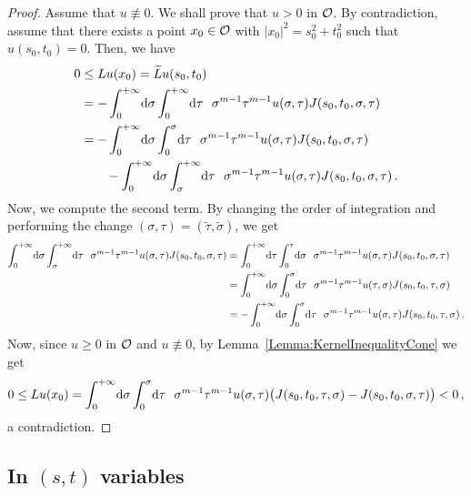 \begin{proof}
Assume that $u \not \equiv 0$. We shall prove that $u > 0$ in $\mathcal{O}$. By contradiction, assume that there exists a point $x_0\in \mathcal{O}$ with $|x_0|^2 = s_0^2 + t_0^2$ such that $u(s_0, t_0)= 0$. Then, we have
\begin{align*}
0 &\leq Lu(x_0) = \widetilde{L} u (s_0,t_0) \\
&= - \int_0^{+\infty} \!\! \d \sigma \int_0^{+\infty} \!\! \d \tau \ \ \sigma^{m-1} \tau^{m-1} u(\sigma, \tau) J(s_0,t_0,\sigma, \tau)   \\
& = - \int_0^{+\infty}  \!\! \d \sigma \int_0^{\sigma}  \!\! \d \tau \ \ \sigma^{m-1} \tau^{m-1} u(\sigma, \tau) J(s_0,t_0,\sigma, \tau)   \\
& \quad \quad - \int_0^{+\infty}  \!\!  \d \sigma \int_{\sigma}^{+\infty} \!\!  \d \tau \ \ \sigma^{m-1} \tau^{m-1} u(\sigma, \tau) J(s_0,t_0,\sigma, \tau)\,.
\end{align*}
Now, we compute the second term. By changing the order of integration and performing the change $(\sigma,\tau) = (\tilde{\tau}, \tilde{\sigma})$, we get
\begin{align*}
\int_0^{+\infty} \!\!  \d \sigma \int_{\sigma}^{+\infty} \!\!  \d \tau \ \ \sigma^{m-1} \tau^{m-1} u(\sigma, \tau) J(s_0,t_0,\sigma, \tau) & =  \int_{0}^{+\infty}  \!\! \d \tau \int_0^{\tau}   \!\! \d \sigma \ \ \sigma^{m-1} \tau^{m-1} u(\sigma, \tau) J(s_0,t_0,\sigma, \tau)   \\
& =  \int_0^{+\infty}  \!\! \d \sigma \int_0^{\sigma}  \!\! \d \tau \ \ \sigma^{m-1} \tau^{m-1} u(\tau, \sigma) J(s_0,t_0,\tau, \sigma)   \\
& =  - \int_0^{+\infty}  \!\! \d \sigma \int_0^{\sigma}  \!\! \d \tau \ \ \sigma^{m-1} \tau^{m-1} u( \sigma, \tau) J(s_0,t_0,\tau, \sigma) \,.  \\
\end{align*}
Now, since $u\geq 0$ in $\mathcal{O}$ and $u \not \equiv 0$, by Lemma~\ref{Lemma:KernelInequalityCone} we get 
$$
0 \leq Lu(x_0) = \int_0^{+\infty}  \!\! \d \sigma \int_0^{\sigma}  \!\! \d \tau \ \ \sigma^{m-1} \tau^{m-1} u(\sigma, \tau) \big( J(s_0,t_0,\tau, \sigma) - J(s_0,t_0,\sigma, \tau)   \big ) < 0\,,
$$
a contradiction.
\end{proof}


\subsection{In $(s,t)$ variables}

